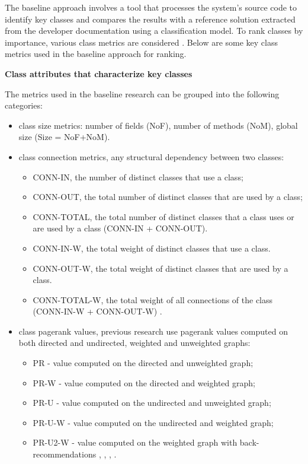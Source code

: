The baseline approach involves a tool that processes the system’s source code to identify key classes and compares the results with a reference solution extracted from the developer documentation using a classification model. To rank classes by importance, various class metrics are considered \cite{Ding2016AnIA, ZaidmanJurnal, PAN2018188}. Below are some key class metrics used in the baseline approach for ranking.

\textbf{Class attributes that characterize key classes}


The metrics used in the baseline research can be grouped into the following categories: 

\begin{itemize}
	\item class size metrics: number of fields (NoF),  number of methods (NoM), global size (Size = NoF+NoM).
	\item class connection metrics, any structural dependency between two classes:
		\begin{itemize}
			\item CONN-IN, the number of distinct classes that use a class;
			\item CONN-OUT, the total number of distinct classes that are used by a class;
			\item CONN-TOTAL, the total number of distinct classes that a class uses or are used by a class (CONN-IN + CONN-OUT).
			\item CONN-IN-W, the total weight of distinct classes that use a class. 
			\item CONN-OUT-W, the total weight of distinct classes that are used by a class. 
			\item CONN-TOTAL-W, the total weight of all connections of the class (CONN-IN-W + CONN-OUT-W) \cite{Finding-key-classes}.
		\end{itemize}
	\item class pagerank values, previous research use pagerank values computed on both directed and undirected, weighted and unweighted graphs:
		\begin{itemize}
			\item PR - value computed on the directed and unweighted graph;
			\item PR-W - value computed on the directed and weighted graph;
			\item PR-U - value computed on the undirected and unweighted graph;
			\item PR-U-W - value computed on the undirected and weighted graph;
			\item PR-U2-W - value computed on the weighted graph with back-recommendations \cite{PagerankENASE}, \cite{enase15}, \cite{Finding-key-classes}, \cite{PagerankSACI}.
		\end{itemize}
\end{itemize}


